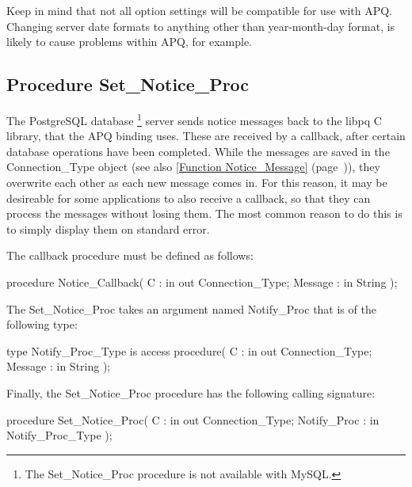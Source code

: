 \documentclass[english,letterpaper]{book}
\newcommand\Ref[1]{\textsection\ref{#1} (page~\pageref{#1})}
\begin{document}
Keep in mind that not all option settings will be compatible for use
with APQ. Changing server date formats to anything other than year-month-day
format, is likely to cause problems within APQ, for example.


\subsection{Procedure Set\_Notice\_Proc}

The PostgreSQL database
\footnote{The Set\_Notice\_Proc procedure is not available with MySQL.}
server sends notice messages back to the libpq C library, that the
APQ binding uses. These are received by a callback, after certain
database operations have been completed. While the messages are saved
in the Connection\_Type object (see also \Ref{Function Notice_Message}),
they overwrite each other as each new message comes in. For this reason,
it may be desireable for some applications to also receive a callback,
so that they can process the messages without losing them. The most
common reason to do this is to simply display them on standard error.

The callback procedure must be defined as follows:

\begin{Code}
procedure Notice_Callback(
   C :       in out Connection_Type;
   Message : in     String
);
\end{Code}

The Set\_Notice\_Proc takes an argument named Notify\_Proc that is
of the following type:

\begin{Code}
type Notify_Proc_Type is access
   procedure(
      C :       in out Connection_Type;
      Message : in     String
   );
\end{Code}

Finally, the Set\_Notice\_Proc procedure has the following calling signature:

\begin{Code}
procedure Set_Notice_Proc(
   C :           in out Connection_Type;
   Notify_Proc : in     Notify_Proc_Type
);
\end{Code}
\end{document}
